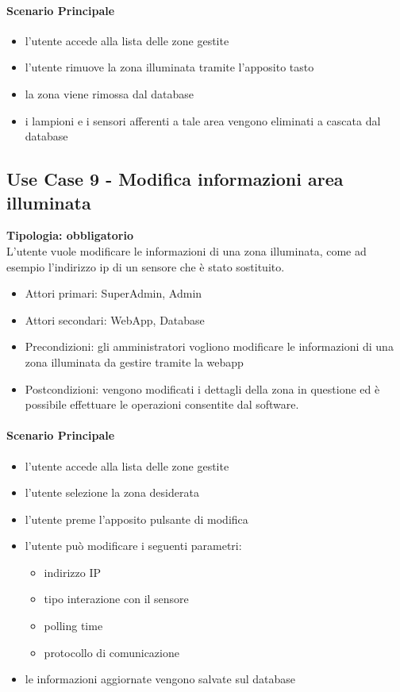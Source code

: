 \documentclass[12pt]{article}
\begin{document}
\paragraph{Scenario Principale}
\begin{itemize}
	\item l'utente accede alla lista delle zone gestite
	\item l'utente rimuove la zona illuminata tramite l'apposito tasto
	\item la zona viene rimossa dal database 
	\item i lampioni e i sensori afferenti a tale area vengono eliminati a cascata dal database
\end{itemize}

\subsection{Use Case 9 - Modifica informazioni area illuminata}
\textbf{Tipologia: obbligatorio} \\
L'utente vuole modificare le informazioni di una zona illuminata, come ad esempio l'indirizzo ip di un sensore che è stato sostituito.
\begin{itemize}
	\item Attori primari: SuperAdmin, Admin
	\item Attori secondari: WebApp, Database
	\item Precondizioni: gli amministratori vogliono modificare le informazioni di una  zona illuminata da gestire tramite la webapp
	\item Postcondizioni: vengono modificati i dettagli della zona in questione ed è possibile effettuare le operazioni consentite dal software.
\end{itemize}
\paragraph{Scenario Principale}
\begin{itemize}
	\item l'utente accede alla lista delle zone gestite
	\item l'utente selezione la zona desiderata
	\item l'utente preme l'apposito pulsante di modifica
	\item l'utente può modificare i seguenti parametri:
		\begin{itemize}
			\item indirizzo IP
			\item tipo interazione con il sensore
			\item polling time
			\item protocollo di comunicazione
		\end{itemize}
	\item le informazioni aggiornate vengono salvate sul database
\end{itemize}
\end{document}
